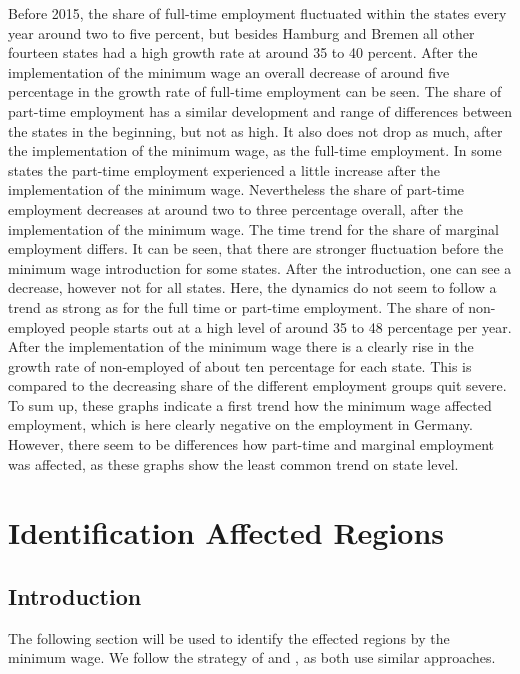 \documentclass[a4paper]{article}
\begin{document}
Before 2015, the share of full-time employment fluctuated within the states every year around two to five percent, but besides Hamburg and Bremen all other fourteen states had a high growth rate at around 35 to 40 percent.  After the implementation of the minimum wage an overall decrease of around five percentage in the growth rate of full-time employment can be seen. \newline
The share of part-time employment has a similar development and range of differences between the states in the beginning, but not as high. It also does not drop as much, after the implementation of the minimum wage, as the full-time employment. In some states the part-time employment experienced a little increase after the implementation of the minimum wage. Nevertheless the share of part-time employment decreases at around two to three percentage overall, after the implementation of the minimum wage. \newline
The time trend for the share of marginal employment differs. It can be seen, that there are stronger fluctuation before the minimum wage introduction for some states. After the introduction, one can see a decrease, however not for all states. Here, the dynamics do not seem to follow a trend as strong as for the full time or part-time employment. \newline
The share of non-employed people starts out at a high level of around 35 to 48 percentage per year. After the implementation of the minimum wage there is a clearly rise in the growth rate of non-employed of about ten percentage for each state. This is compared to the decreasing share of the different employment groups quit severe. To sum up, these graphs indicate a first trend how the minimum wage affected employment, which is here clearly negative on the employment in Germany. However, there seem to be differences how part-time and marginal employment was affected, as these graphs show the least common trend on state level.
%
%
%
\newpage
\section{Identification Affected Regions}
\subsection{Introduction}
The following section will be used to identify the effected regions by the minimum wage. We follow the strategy of \cite{schmitz2017effects} and \cite{caliendo2017short}, as both use similar approaches.
\end{document}
